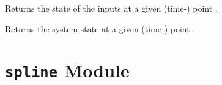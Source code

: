 \documentclass[letterpaper,10pt,english]{sphinxmanual}
\begin{document}
\begin{fulllineitems}
\begin{fulllineitems}
\label{pytrajectory:pytrajectory.trajectory.Trajectory.u}
Returns the state of the inputs at a given (time-) point .

\end{fulllineitems}


\begin{fulllineitems}
\label{pytrajectory:pytrajectory.trajectory.Trajectory.x}
Returns the system state at a given (time-) point .

\end{fulllineitems}


\end{fulllineitems}



\section{\texttt{spline} Module}
\label{pytrajectory:spline-module}\label{pytrajectory:module-pytrajectory.spline}
\end{document}
